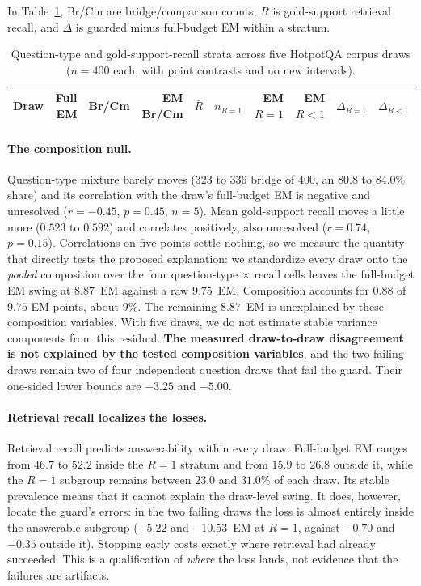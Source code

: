 \documentclass[manuscript,nonacm]{acmart}
\begin{document}
In Table~\ref{tab:supp-strata}, Br/Cm are bridge/comparison counts, $R$ is
gold-support retrieval recall, and $\Delta$ is guarded minus full-budget EM
within a stratum.

\begin{table}[htbp]
\caption{Question-type and gold-support-recall strata across five HotpotQA
corpus draws ($n{=}400$ each, with point contrasts and no new intervals).}
\label{tab:supp-strata}
\footnotesize
\setlength{\tabcolsep}{3pt}
\begin{tabular}{lrrrrrrrrr}
\toprule
Draw & Full EM & Br/Cm & EM Br/Cm & $\bar{R}$ & $n_{R=1}$ & EM $R{=}1$ &
EM $R{<}1$ & $\Delta_{R=1}$ & $\Delta_{R<1}$ \\
\midrule

\bottomrule
\end{tabular}
\end{table}

\paragraph{The composition null.} Question-type mixture barely moves
($323$ to $336$ bridge of $400$, an $80.8$ to $84.0\%$ share) and its correlation
with the draw's full-budget EM is negative and unresolved
($r{=}-0.45$, $p{=}0.45$, $n{=}5$). Mean gold-support recall moves a little
more ($0.523$ to $0.592$) and correlates positively, also unresolved
($r{=}0.74$, $p{=}0.15$). Correlations on five points settle nothing, so we
measure the quantity that directly tests the proposed explanation: we
standardize every draw
onto the \emph{pooled} composition over the four question-type
$\times$ recall cells leaves the full-budget EM swing at $8.87$~EM against a
raw $9.75$~EM. Composition accounts for $0.88$ of $9.75$ EM points, about
$9\%$. The remaining $8.87$~EM is unexplained by these composition variables.
With five draws, we do not estimate stable variance components from this
residual. \textbf{The measured draw-to-draw disagreement is not explained by
the tested composition variables}, and the two failing draws remain two of
four independent question draws that fail the guard. Their one-sided lower
bounds are $-3.25$ and $-5.00$.

\paragraph{Retrieval recall localizes the losses.} Retrieval recall predicts
answerability within every draw. Full-budget EM ranges from $46.7$ to $52.2$
inside the $R=1$ stratum and from $15.9$ to $26.8$ outside it, while the
$R=1$ subgroup remains between $23.0$ and $31.0\%$ of each draw. Its stable
prevalence means that it cannot explain the draw-level swing. It does,
however, locate the guard's errors:
in the two failing draws the loss is almost entirely inside the answerable
subgroup ($-5.22$ and $-10.53$~EM at $R{=}1$, against $-0.70$ and $-0.35$
outside it). Stopping early costs exactly where retrieval had already
succeeded. This is a qualification of \emph{where} the loss lands, not
evidence that the failures are artifacts.
\end{document}
